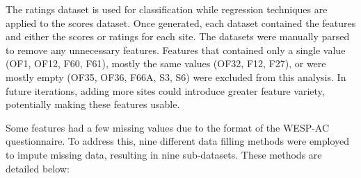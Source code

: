 \documentclass[12pt,letterpaper]{article}
\begin{document}
The ratings dataset is used for classification while regression techniques are applied to the scores dataset.
Once generated, each dataset contained the features and either the scores or ratings for each site.
The datasets were manually parsed to remove any unnecessary features.
Features that contained only a single value (OF1, OF12, F60, F61), mostly the same values (OF32, F12, F27), or were mostly empty (OF35, OF36, F66A, S3, S6) were excluded from this analysis.
In future iterations, adding more sites could introduce greater feature variety, potentially making these features usable.

Some features had a few missing values due to the format of the \ac{WESP-AC} questionnaire.
To address this, nine different data filling methods were employed to impute missing data, resulting in nine sub-datasets.
These methods are detailed below:
\end{document}
